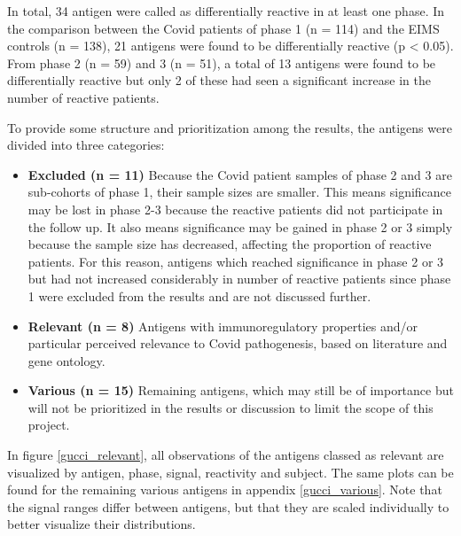 \documentclass{article}
\begin{document}
In total, 34 antigen were called as differentially reactive in at least one phase. In the comparison between the Covid patients of phase 1 (n = 114) and the EIMS controls (n = 138), 21 antigens were found to be differentially reactive (p < 0.05). From phase 2 (n = 59) and 3 (n = 51), a total of 13 antigens were found to be differentially reactive but only 2 of these had seen a significant increase in the number of reactive patients. 

To provide some structure and prioritization among the results, the antigens were divided into three categories:

\begin{itemize}
    \item \textbf{Excluded (n = 11)} Because the Covid patient samples of phase 2 and 3 are sub-cohorts of phase 1, their sample sizes are smaller. This means significance may be lost in phase 2-3 because the reactive patients did not participate in the follow up. It also means significance may be gained in phase 2 or 3 simply because the sample size has decreased, affecting the proportion of reactive patients. For this reason, antigens which reached significance in phase 2 or 3 but had not increased considerably in number of reactive patients since phase 1 were excluded from the results and are not discussed further.
    
    \item \textbf{Relevant (n = 8)} Antigens with immunoregulatory properties and/or particular perceived relevance to Covid pathogenesis, based on literature and gene ontology.
    
    \item \textbf{Various (n = 15)} Remaining antigens, which may still be of importance but will not be prioritized in the results or discussion to limit the scope of this project.
\end{itemize}

In figure \ref{gucci_relevant}, all observations of the antigens classed as relevant are visualized by antigen, phase, signal, reactivity and subject. The same plots can be found for the remaining various antigens in appendix \ref{gucci_various}. Note that the signal ranges differ between antigens, but that they are scaled individually to better visualize their distributions.
\end{document}
